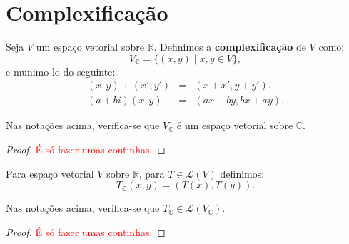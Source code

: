 \documentclass[11pt,twoside,a4paper]{book}
\begin{document}
\newpage

\section{Complexificação}

\begin{definicao}
Seja $V$ um espaço vetorial sobre $\mathbb{R}$. Definimos a \textbf{complexificação} de $V$ como:
\[
V_\mathbb{C}=\{(x,y)\mid x,y\in V\},
\]
e munimo-lo do seguinte:
\[
\begin{array}{rcl}
(x,y)+(x',y')&=&(x+x',y+y').\\
(a+bi)(x,y)&=&(ax-by,bx+ay).
\end{array}
\]
\end{definicao}

\begin{proposicao}
Nas notações acima, verifica-se que $V_\mathbb{C}$ é um espaço vetorial sobre $\mathbb{C}$.
\end{proposicao}
\begin{proof}
\textcolor{red}{É só fazer umas continhas.}
\end{proof}

\begin{definicao}
Para espaço vetorial $V$ sobre $\mathbb{R}$, para $T\in\mathcal{L}(V)$ definimos:
\[
T_\mathbb{C}(x,y)=(T(x),T(y)).
\]
\end{definicao}

\begin{proposicao}
Nas notações acima, verifica-se que $T_\mathbb{C}\in\mathcal{L}(V_\mathbb{C})$.
\end{proposicao}
\begin{proof}
\textcolor{red}{É só fazer umas continhas.}
\end{proof}
\end{document}
